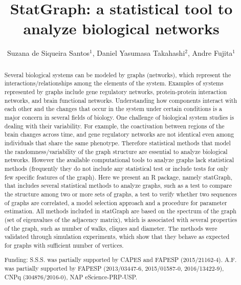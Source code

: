\documentclass[twoside]{article}
\title{\vspace{-15mm}\fontsize{24pt}{10pt}\selectfont\textbf{StatGraph: a statistical tool to analyze biological networks}} %
\author{Suzana de Siqueira Santos$^1$, Daniel Yasumasa Takahashi$^2$, Andre Fujita$^1$}
\affil{1 IME - USP\\ 2 DEPARTMENT OF PSYCHOLOGY AND NEUROSCIENCE INSTITUTE, PRINCETON UNIVERSITY, PRINCETON, UNITED STATES OF AMERICA\\ }
\date{}
\begin{document}
\maketitle %

\thispagestyle{fancy} %


\begin{abstract}
Several biological systems can be modeled by graphs (networks), which represent the interactions/relationships among the elements of the system. Examples of systems represented by graphs include gene regulatory networks, protein-protein interaction networks, and brain functional networks. Understanding how components interact with each other and the changes that occur in the system under certain conditions is a major concern in several fields of biology. One challenge of biological system studies is dealing with their variability. For example, the coactivation between regions of the brain changes across time, and gene regulatory networks are not identical even among individuals that share the same phenotype. Therefore statistical methods that model the randomness/variability of the graph structure are essential to analyze biological networks. However the available computational tools to analyze graphs lack statistical methods (frequently they do not include any statistical test or include tests for only few specific features of the graph). Here we present an R package, namely statGraph, that includes several statistical methods to analyze graphs, such as a test to compare the structure among two or more sets of graphs, a test to verify whether two sequences of graphs are correlated, a model selection approach and a procedure for parameter estimation. All methods included in statGraph are based on the spectrum of the graph (set of eigenvalues of the adjacency matrix), which is associated with several properties of the graph, such as number of walks, cliques and diameter. The methods were validated through simulation experiments, which show that they behave as expected for graphs with sufficient number of vertices.

Funding: S.S.S. was partially supported by CAPES and FAPESP (2015/21162-4). A.F. was partially supported by FAPESP (2013/03447-6, 2015/01587-0, 2016/13422-9), CNPq (304876/2016-0), NAP eScience-PRP-USP.
\end{abstract}
\end{document}
